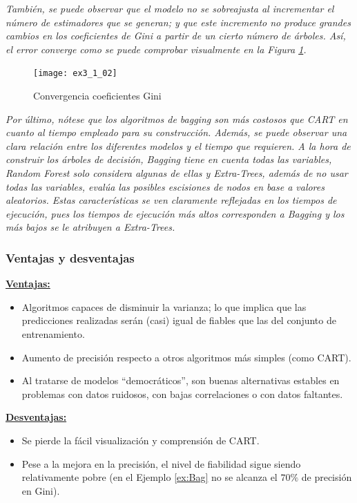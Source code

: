 \documentclass[12pt,twoside]{article}
\begin{document}
\emph{También, se puede observar que el modelo no se sobreajusta al incrementar el número de estimadores que se generan; y que este incremento no produce grandes cambios en los coeficientes de Gini a partir de un cierto número de árboles. Así, el error converge como se puede comprobar visualmente en la Figura \ref{fig:exbagging}.}

\begin{figure}[h]
\centering
\texttt{[image: ex3\_1\_02]}
\caption{Convergencia coeficientes Gini}
\label{fig:exbagging}
\end{figure}

\emph{Por último, nótese que los algoritmos de bagging son más costosos que CART en cuanto al tiempo empleado para su construcción. Además, se puede observar una clara relación entre los diferentes modelos y el tiempo que requieren. A la hora de construir los árboles de decisión, Bagging tiene en cuenta todas las variables, Random Forest solo considera algunas de ellas y Extra-Trees, además de no usar todas las variables, evalúa las posibles escisiones de nodos en base a valores aleatorios. Estas características se ven claramente reflejadas en los tiempos de ejecución, pues los tiempos de ejecución más altos corresponden a Bagging y los más bajos se le atribuyen a Extra-Trees.}


\subsubsection{Ventajas y desventajas}
\textbf{\underline{Ventajas:}}
\begin{itemize}
\item  Algoritmos capaces de disminuir la varianza; lo que implica que las predicciones realizadas serán (casi) igual de fiables que las del conjunto de entrenamiento.
\item Aumento de precisión respecto a otros algoritmos más simples (como CART).
\item Al tratarse de modelos ``democráticos'', son buenas alternativas estables en problemas con datos ruidosos, con bajas correlaciones o con datos faltantes.
\end{itemize}

\textbf{\underline{Desventajas:}}
\begin{itemize}
\item Se pierde la fácil visualización y comprensión de CART.
\item Pese a la mejora en la precisión, el nivel de fiabilidad sigue siendo relativamente pobre (en el Ejemplo \ref{ex:Bag} no se alcanza el $70 \%$ de precisión en Gini).
\end{itemize}
\end{document}
